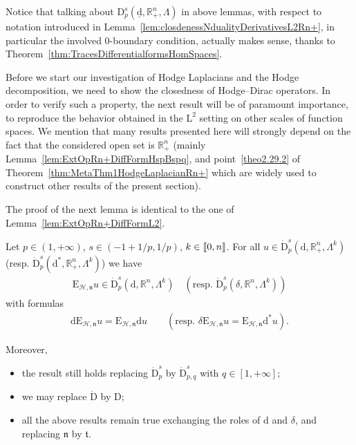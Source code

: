 \documentclass[AHL,Unicode,longabstracts,published]{cedram}
\newcommand{\bbR}{\mathbb{R}}
\newcommand{\rmd}{\mathrm{d}}
\newcommand{\rmD}{\mathrm{D}}
\newcommand{\rmL}{\mathrm{L}}
\newcommand{\rmE}{\mathrm{E}}
\newcommand{\clH}{\mathcal{H}}
\newcommand{\fkn}{\mathfrak{n}}
\newcommand{\fkt}{\mathfrak{t}}
\newcommand{\llbracket}{\mathopen{[\mkern -2.7mu[}}
\newcommand{\rrbracket}{\mathclose{]\mkern -2.7mu]}}
\newcommand{\llb}{\llbracket}
\newcommand{\rrb}{\rrbracket}
\begin{document}
\begin{rema}
Notice that talking about $\rmD^{s}_{p}(\underline{\rmd},\bbR^n_+,\Lambda)$ in above lemmas, with respect to notation introduced in Lemma~\ref{lem:closdenessNdualityDerivativesL2Rn+}, in particular the involved $0$-boundary condition, actually makes sense, thanks to Theorem~\ref{thm:TracesDifferentialformsHomSpaces}.
\end{rema}


Before we start our investigation of Hodge Laplacians and the Hodge decomposition, we need to show the closedness of Hodge--Dirac operators. In order to verify such a property, the next result will be of paramount importance, to reproduce the behavior obtained in the $\rmL^2$ setting on other scales of function spaces. We mention that many results presented here will strongly depend on the fact that the considered open set is $\bbR^n_+$ (mainly Lemma~\ref{lem:ExtOpRn+DiffFormHspBspq}, and point~\eqref{theo2.29.2} of Theorem~\ref{thm:MetaThm1HodgeLaplacianRn+} which are widely used to construct other results of the present section).

The proof of the next lemma is identical to the one of Lemma~\ref{lem:ExtOpRn+DiffFormL2}.



\begin{lemm}\label{lem:ExtOpRn+DiffFormHspBspq}
Let $p\in(1,+\infty)$, $s\in(-1+1/p,1/p)$, $k\in\llb 0,n \rrb$. For all $u\in\dot{\rmD}^{s}_{p}(\rmd,\bbR^n_+,\Lambda^{k})$ (resp. $\dot{\rmD}^{s}_{p}({\rmd}^\ast,\bbR^n_+,\Lambda^{k})$) we have
\begin{align*}
\rmE_{\clH,\fkn} u \in \dot{\rmD}^{s}_{p}\left(\rmd,\bbR^n,\Lambda^{k}\right) \quad\left(\text{resp. } \dot{\rmD}^{s}_{p}\left(\delta,\bbR^n,\Lambda^{k}\right)\right)
\end{align*}
with formulas
\begin{align*}
\rmd \rmE_{\clH,\fkn} u = \rmE_{\clH,\fkn} \rmd u \qquad \left(\text{resp. } \delta \rmE _{\clH,\fkn} u = \rmE_{\clH,\fkn} \rmd^\ast u \right).
\end{align*}

Moreover,
\begin{itemize}
\item the result still holds replacing $\dot{\rmD}^{s}_{p}$ by $\dot{\rmD}^{s}_{p,q}$ with $q\in[1,+\infty]$;

\item we may replace $\dot{\rmD}$ by $\rmD$;

\item all the above results remain true exchanging the roles of $\rmd$ and $\delta$, and replacing $\fkn$ by $\fkt$.
\end{itemize}
\end{lemm}
\end{document}
